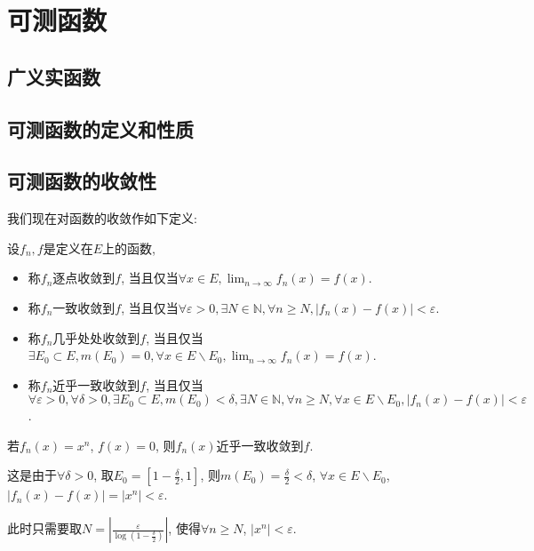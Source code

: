 \documentclass[theorem=false,mathfont=none,openany,sub3section]{easybook}
\newcommand{\btocgroup}[1][toc]{\addtocontents{#1}{\string\begingroup}}
\newcommand{\etocgroup}[1][toc]{\addtocontents{#1}{\string\endgroup}}
\begin{document}
\btocgroup
{}
\chapter{可测函数}
\etocgroup

\section{广义实函数}


\section{可测函数的定义和性质}

\section{可测函数的收敛性}

我们现在对函数的收敛作如下定义:\par

\begin{definition}
  设$f_n,f$是定义在$E$上的函数, 
  \begin{itemize}
    \item 称$f_n$逐点收敛到$f$, 当且仅当$\forall x\in E, \lim_{n \to \infty}f_n(x)=f(x)$.\par
    \item 称$f_n$一致收敛到$f$, 当且仅当$\forall \varepsilon>0, \exists N\in \mathbb{N}, \forall n\geqslant N, |f_n(x)-f(x)|<\varepsilon$.\par
    \item 称$f_n$几乎处处收敛到$f$, 当且仅当$\exists E_0\subset E, m(E_0) = 0, \forall x\in E\backslash E_0, \lim_{n \to \infty}f_n(x)=f(x)$.\par
    \item 称$f_n$近乎一致收敛到$f$, 当且仅当$\forall \varepsilon>0, \forall \delta > 0, \exists E_0\subset E, m(E_0) < \delta, \exists N\in \mathbb{N}, \forall n\geqslant N, \forall x\in E\backslash E_0, |f_n(x)-f(x)|<\varepsilon$.\par
  \end{itemize}
\end{definition}

\begin{example}
  若$f_n(x)=x^n$, $f(x)=0$, 则$f_n(x)$近乎一致收敛到$f$.\par
  这是由于$\forall \delta>0$, 取$E_0 =\left[1-\frac{\delta}{2},1\right]$, 则$m(E_0)=\frac{\delta}{2}<\delta$, $\forall x\in E\backslash E_0$, $|f_n(x)-f(x)|=|x^n|<\varepsilon$.\par
  此时只需要取$N=\left|\frac{\varepsilon}{\log \left(1-\frac{\delta}{2}\right)}\right|$, 使得$\forall n\geqslant N$, $|x^n|<\varepsilon$.\par
\end{example}
\end{document}
